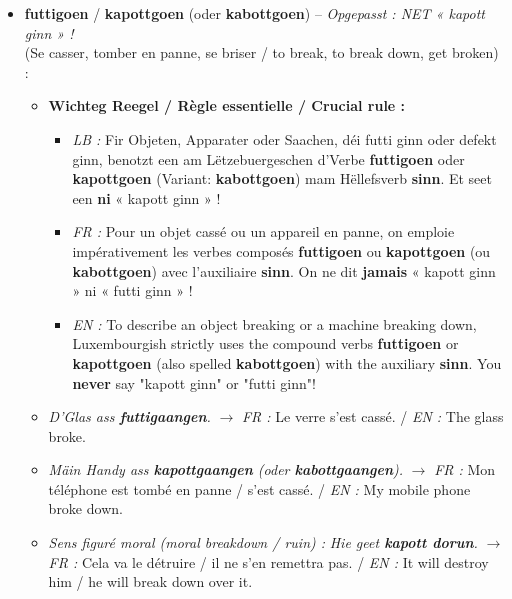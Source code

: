 \begin{itemize}
    \vspace{0.4em}

    \item \textbf{futtigoen} / \textbf{kapottgoen} (oder \textbf{kabottgoen}) -- \textit{Opgepasst : NET « kapott ginn » !} \\
    (Se casser, tomber en panne, se briser / to break, to break down, get broken) :
    \begin{itemize}
        \item \textbf{Wichteg Reegel / Règle essentielle / Crucial rule :}
        \begin{itemize}
            \item \textit{LB :} Fir Objeten, Apparater oder Saachen, déi futti ginn oder defekt ginn, benotzt een am Lëtzebuergeschen d'Verbe \textbf{futtigoen} oder \textbf{kapottgoen} (Variant: \textbf{kabottgoen}) mam Hëllefsverb \textbf{sinn}. Et seet een \textbf{ni} « kapott ginn » !
            \item \textit{FR :} Pour un objet cassé ou un appareil en panne, on emploie impérativement les verbes composés \textbf{futtigoen} ou \textbf{kapottgoen} (ou \textbf{kabottgoen}) avec l'auxiliaire \textbf{sinn}. On ne dit \textbf{jamais} « kapott ginn » ni « futti ginn » !
            \item \textit{EN :} To describe an object breaking or a machine breaking down, Luxembourgish strictly uses the compound verbs \textbf{futtigoen} or \textbf{kapottgoen} (also spelled \textbf{kabottgoen}) with the auxiliary \textbf{sinn}. You \textbf{never} say "kapott ginn" or "futti ginn"!
        \end{itemize}
        \item \textit{D'Glas ass \textbf{futtigaangen}.} $\rightarrow$ \textit{FR :} Le verre s'est cassé. / \textit{EN :} The glass broke.
        \item \textit{Mäin Handy ass \textbf{kapottgaangen} (oder \textbf{kabottgaangen}).} $\rightarrow$ \textit{FR :} Mon téléphone est tombé en panne / s'est cassé. / \textit{EN :} My mobile phone broke down.
        \item \textit{Sens figuré moral (moral breakdown / ruin) :} \textit{Hie geet \textbf{kapott dorun}.} $\rightarrow$ \textit{FR :} Cela va le détruire / il ne s'en remettra pas. / \textit{EN :} It will destroy him / he will break down over it.
    \end{itemize}

    \vspace{0.4em}


\end{itemize}
